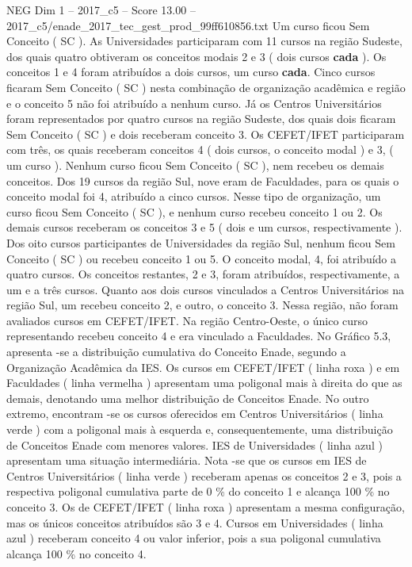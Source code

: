 \begin{textsample}{NEG Dim 1 – 2017\_c5 – Score 13.00 – 2017\_c5/enade\_2017\_tec\_gest\_prod\_99ff610856.txt}
Um curso ficou Sem Conceito ( SC ).
As Universidades participaram com 11 cursos na região Sudeste, dos quais quatro obtiveram os conceitos modais 2 e 3 ( dois cursos \textbf{cada} ).
Os conceitos 1 e 4 foram atribuídos a dois cursos, um curso \textbf{cada}.
Cinco cursos ficaram Sem Conceito ( SC ) nesta combinação de organização acadêmica e região e o conceito 5 não foi atribuído a nenhum curso.
Já os Centros Universitários foram representados por quatro cursos na região Sudeste, dos quais dois ficaram Sem Conceito ( SC ) e dois receberam conceito 3.
Os CEFET/IFET participaram com três, os quais receberam conceitos 4 ( dois cursos, o conceito modal ) e 3, ( um curso ).
Nenhum curso ficou Sem Conceito ( SC ), nem recebeu os demais conceitos.
Dos 19 cursos da região Sul, nove eram de Faculdades, para os quais o conceito modal foi 4, atribuído a cinco cursos.
Nesse tipo de organização, um curso ficou Sem Conceito ( SC ), e nenhum curso recebeu conceito 1 ou 2.
Os demais cursos receberam os conceitos 3 e 5 ( dois e um cursos, respectivamente ).
Dos oito cursos participantes de Universidades da região Sul, nenhum ficou Sem Conceito ( SC ) ou recebeu conceito 1 ou 5.
O conceito modal, 4, foi atribuído a quatro cursos.
Os conceitos restantes, 2 e 3, foram atribuídos, respectivamente, a um e a três cursos.
Quanto aos dois cursos vinculados a Centros Universitários na região Sul, um recebeu conceito 2, e outro, o conceito 3.
Nessa região, não foram avaliados cursos em CEFET/IFET.
Na região Centro-Oeste, o único curso representando recebeu conceito 4 e era vinculado a Faculdades.
No Gráfico 5.3, apresenta -se a distribuição cumulativa do Conceito Enade, segundo a Organização Acadêmica da IES.
Os cursos em CEFET/IFET ( linha roxa ) e em Faculdades ( linha vermelha ) apresentam uma poligonal mais à direita do que as demais, denotando uma melhor distribuição de Conceitos Enade.
No outro extremo, encontram -se os cursos oferecidos em Centros Universitários ( linha verde ) com a poligonal mais à esquerda e, consequentemente, uma distribuição de Conceitos Enade com menores valores.
IES de Universidades ( linha azul ) apresentam uma situação intermediária.
Nota -se que os cursos em IES de Centros Universitários ( linha verde ) receberam apenas os conceitos 2 e 3, pois a respectiva poligonal cumulativa parte de 0 \% do conceito 1 e alcança 100 \% no conceito 3.
Os de CEFET/IFET ( linha roxa ) apresentam a mesma configuração, mas os únicos conceitos atribuídos são 3 e 4.
Cursos em Universidades ( linha azul ) receberam conceito 4 ou valor inferior, pois a sua poligonal cumulativa alcança 100 \% no conceito 4.

\end{textsample}
